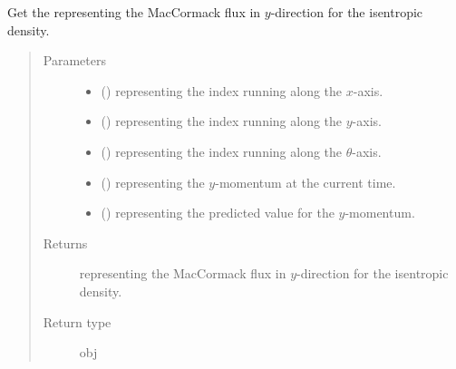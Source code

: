 \documentclass[letterpaper,10pt,english]{sphinxmanual}
\begin{document}
\begin{fulllineitems}
\begin{fulllineitems}
\label{\detokenize{api:tasmania.dycore.flux_isentropic_maccormack.FluxIsentropicMacCormack._get_maccormack_flux_y_s}}
Get the  representing the MacCormack flux in \(y\)-direction
for the isentropic density.
\begin{quote}\begin{description}
\item[{Parameters}] \leavevmode\begin{itemize}
\item {} 
 () \textendash{}  representing the index running along the \(x\)-axis.

\item {} 
 () \textendash{}  representing the index running along the \(y\)-axis.

\item {} 
 () \textendash{}  representing the index running along the \(\theta\)-axis.

\item {} 
 () \textendash{}  representing the \(y\)-momentum at the current time.

\item {} 
 () \textendash{}  representing the predicted value for the \(y\)-momentum.

\end{itemize}

\item[{Returns}] \leavevmode
{} representing the MacCormack flux in \(y\)-direction for the isentropic density.

\item[{Return type}] \leavevmode
obj

\end{description}\end{quote}

\end{fulllineitems}


\end{fulllineitems}
\end{document}
